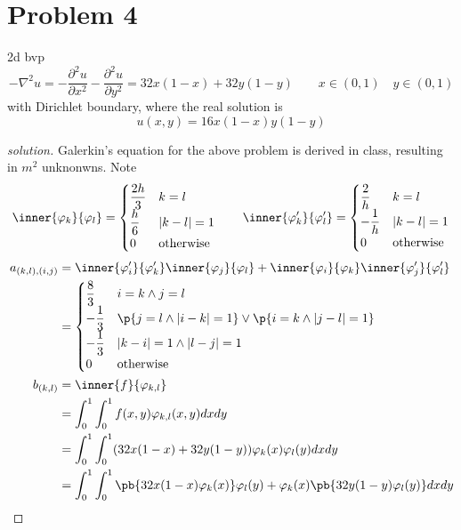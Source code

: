 \documentclass[11pt]{article}
\begin{document}
\section*{Problem 4}
2d bvp
\[
    -\nabla^2 u = -\frac{\partial^2 u}{\partial x^2} - \frac{\partial^2 u}{\partial y^2} = 32x(1-x) + 32y(1-y)
    \quad\quad
    x\in(0,1) 
    \quad 
    y\in(0,1)    
\]
with Dirichlet boundary, where the real solution is 
\[
    u(x,y) = 16x(1-x)y(1-y)    
\]
\begin{proof}[solution]
    Galerkin's equation for the above problem is derived in class, resulting in $m^2$ unknonwns. Note 
    \[
        \inner{\varphi_k}{\varphi_l} = 
        \begin{cases}
            \dfrac{2h}{3} & k = l \\
            \dfrac{h}{6} &  \abs{k-l} = 1\\
            0 & \text{otherwise}
        \end{cases}
        \quad\quad
        \inner{\varphi_k'}{\varphi_l'} = 
        \begin{cases}
             \dfrac{2}{h} & k = l \\
            -\dfrac{1}{h} &  \abs{k-l} = 1\\
            0 & \text{otherwise}
        \end{cases}
    \]
    \begin{align*}
        a_{(k,l),(i,j)} 
            &= \inner{\varphi_i'}{\varphi_k'}\inner{\varphi_j}{\varphi_l}
            + \inner{\varphi_i}{\varphi_k}\inner{\varphi_j'}{\varphi_l'}\\
            &= 
            \begin{cases}
                \dfrac{8}{3} & i = k \land j = l \\
                -\dfrac{1}{3} & \p{j=l \land \abs{i-k}=1}\lor\p{i=k \land \abs{j-l}=1} \\
                -\dfrac{1}{3} & \abs{k-i}=1 \land \abs{l-j}=1 \\
                0 & \text{otherwise}\\
            \end{cases} \\
        b_{(k,l)} 
            &= \inner{f}{\varphi_{k,l}} \\
            &= \int_0^1 \int_0^1 f(x,y) \varphi_{k,l}(x,y) dx dy \\
            &= \int_0^1 \int_0^1 (32x(1-x) + 32y(1-y))\varphi_k(x)\varphi_l(y) dx dy \\
            &= \int_0^1 \int_0^1 \pb{32x(1-x)\varphi_k(x)}\varphi_l(y)+\varphi_k(x) \pb{32y(1-y)\varphi_l(y)} dx dy \\

\end{align*}
\end{proof}
\end{document}
